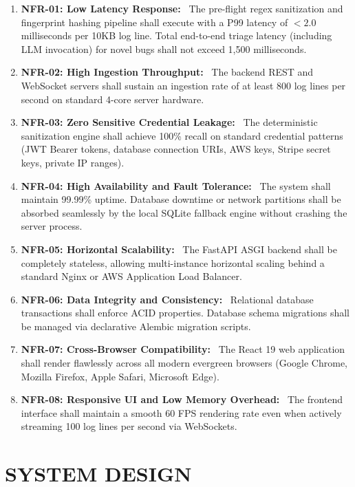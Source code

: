 \documentclass[12pt,a4paper]{article}
\newcommand{\lead}[1]{\textbf{#1}\ }
\begin{document}
\begin{enumerate}[leftmargin=1.5em,itemsep=6pt]
    \item \lead{NFR-01: Low Latency Response:} The pre-flight regex sanitization and fingerprint hashing pipeline shall execute with a P99 latency of $< 2.0$ milliseconds per 10KB log line. Total end-to-end triage latency (including LLM invocation) for novel bugs shall not exceed 1,500 milliseconds.
    \item \lead{NFR-02: High Ingestion Throughput:} The backend REST and WebSocket servers shall sustain an ingestion rate of at least 800 log lines per second on standard 4-core server hardware.
    \item \lead{NFR-03: Zero Sensitive Credential Leakage:} The deterministic sanitization engine shall achieve 100\% recall on standard credential patterns (JWT Bearer tokens, database connection URIs, AWS keys, Stripe secret keys, private IP ranges).
    \item \lead{NFR-04: High Availability and Fault Tolerance:} The system shall maintain 99.99\% uptime. Database downtime or network partitions shall be absorbed seamlessly by the local SQLite fallback engine without crashing the server process.
    \item \lead{NFR-05: Horizontal Scalability:} The FastAPI ASGI backend shall be completely stateless, allowing multi-instance horizontal scaling behind a standard Nginx or AWS Application Load Balancer.
    \item \lead{NFR-06: Data Integrity and Consistency:} Relational database transactions shall enforce ACID properties. Database schema migrations shall be managed via declarative Alembic migration scripts.
    \item \lead{NFR-07: Cross-Browser Compatibility:} The React 19 web application shall render flawlessly across all modern evergreen browsers (Google Chrome, Mozilla Firefox, Apple Safari, Microsoft Edge).
    \item \lead{NFR-08: Responsive UI and Low Memory Overhead:} The frontend interface shall maintain a smooth 60 FPS rendering rate even when actively streaming 100 log lines per second via WebSockets.
\end{enumerate}

\clearpage
\section{SYSTEM DESIGN}\label{sec:system_design}
\end{document}
